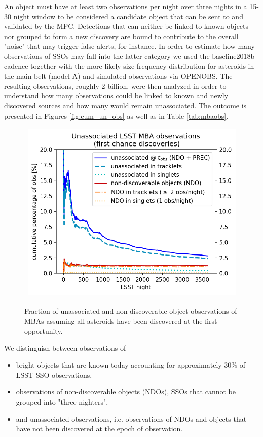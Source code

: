 An object must have at least two observations per night over three nights in a 15-30 night window to be considered a candidate object that can be sent to and validated by the \gls{MPC}.
Detections that can neither be linked to known objects nor grouped to form a new discovery are bound to contribute to the overall "noise" that may trigger false alerts, for instance. In order to estimate how many observations of SSOs may fall into the latter category we used the baseline2018b cadence together with the more likely size-frequency distribution for asteroids in the main belt (model A) and simulated observations via OPENOBS. The resulting observations, roughly 2 billion, were then analyzed in order to understand how many observations could be linked to known and newly discovered sources and how many would remain unassociated. The outcome is presented in Figures \ref{fig:cum_un_obs} as well as in Table \ref{tab:mbaobs}. 
\begin{figure}[tb!]
\begin{center}
\begin{tabular}{c}
\includegraphics[width=0.70\linewidth]{figs/unasoc_frac_first_chance2.png}
\end{tabular}
\end{center}
\caption{Fraction of unassociated and non-discoverable object observations of MBAs assuming all asteroids have been discovered at the first opportunity.  \label{fig:ufc} }
\end{figure}
We distinguish between observations of 
\begin{itemize}
\item bright objects that are known today accounting for approximately 30\% of \gls{LSST} \gls{SSO} observations,
\item observations of non-discoverable objects (NDOs), SSOs that cannot be grouped into "three nighters", 
\item and unassociated observations, i.e. observations of NDOs and objects that have not been discovered at the \gls{epoch} of observation.
\end{itemize}
